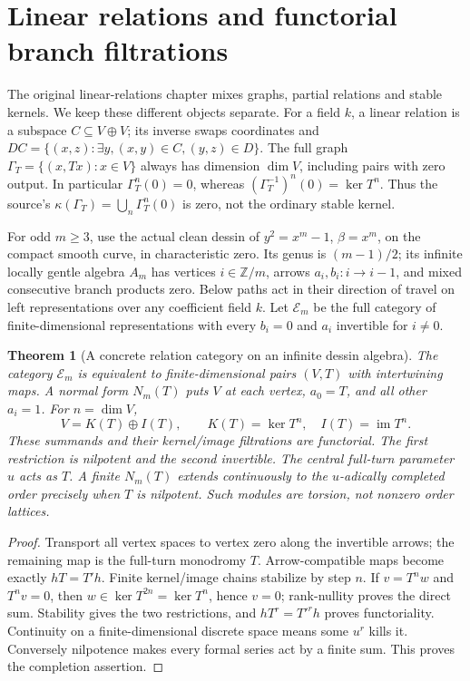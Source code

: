 \documentclass[11pt,oneside,openany]{book}
\newtheorem{theorem}{Theorem}[chapter]
\theoremstyle{definition}\newtheorem{definition}[theorem]{Definition}
\theoremstyle{remark}\newtheorem{remark}[theorem]{Remark}
\begin{document}
\section{Linear relations and functorial branch filtrations}\label{rel:core}
The original linear-relations chapter mixes graphs, partial relations and
stable kernels. We keep these different objects separate. For a field $k$,
a linear relation is a subspace $C\subseteq V\oplus V$; its inverse swaps
coordinates and $DC=\{(x,z):\exists y,(x,y)\in C,(y,z)\in D\}$.
The full graph $\Gamma_T=\{(x,Tx):x\in V\}$ always has dimension
$\dim V$, including pairs with zero output. In particular
$\Gamma_T^n(0)=0$, whereas $(\Gamma_T^{-1})^n(0)=\ker T^n$.
Thus the source's $\kappa(\Gamma_T)=\bigcup_n\Gamma_T^n(0)$ is zero,
not the ordinary stable kernel.

For odd $m\geq3$, use the actual clean dessin of
$y^2=x^m-1$, $\beta=x^m$, on the compact smooth curve, in
characteristic zero. Its genus is $(m-1)/2$; its infinite locally gentle
algebra $A_m$ has vertices $i\in\mathbb Z/m$, arrows
$a_i,b_i:i\to i-1$, and mixed consecutive branch products zero.
Below paths act in their direction of travel on left representations over
any coefficient field $k$. Let $\mathcal E_m$ be the full category of
finite-dimensional representations with every $b_i=0$ and $a_i$ invertible
for $i\ne0$.

\begin{theorem}[A concrete relation category on an infinite dessin algebra]
\label{rel:branch}
The category $\mathcal E_m$ is equivalent to finite-dimensional pairs
$(V,T)$ with intertwining maps. A normal form $N_m(T)$ puts $V$ at each
vertex, $a_0=T$, and all other $a_i=1$. For $n=\dim V$,
\[
 V=K(T)\oplus I(T),\qquad K(T)=\ker T^n,\quad I(T)=\operatorname{im}T^n.
\]
These summands and their kernel/image filtrations are functorial. The first
restriction is nilpotent and the second invertible. The central full-turn
parameter $u$ acts as $T$. A finite $N_m(T)$ extends continuously to the
$u$-adically completed order precisely when $T$ is nilpotent. Such modules
are torsion, not nonzero order lattices.
\end{theorem}
\begin{proof}
Transport all vertex spaces to vertex zero along the invertible arrows;
the remaining map is the full-turn monodromy $T$. Arrow-compatible maps
become exactly $hT=T'h$. Finite kernel/image chains stabilize by step $n$.
If $v=T^nw$ and $T^nv=0$, then $w\in\ker T^{2n}=\ker T^n$, hence $v=0$;
rank-nullity proves the direct sum. Stability gives the two restrictions,
and $hT^r=T'^rh$ proves functoriality. Continuity on a finite-dimensional
discrete space means some $u^r$ kills it. Conversely nilpotence makes every
formal series act by a finite sum. This proves the completion assertion.
\end{proof}
\end{document}
